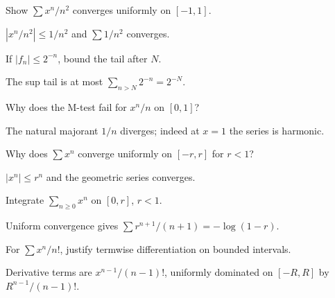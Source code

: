 \begin{problem}\label{prob:ii13-problem-01}
Show $\sum x^n/n^2$ converges uniformly on $[-1,1]$.
\end{problem}
\begin{solution}
$|x^n/n^2|\le1/n^2$ and $\sum1/n^2$ converges.
\end{solution}

\begin{problem}\label{prob:ii13-problem-02}
If $|f_n|\le2^{-n}$, bound the tail after $N$.
\end{problem}
\begin{solution}
The sup tail is at most $\sum_{n>N}2^{-n}=2^{-N}$.
\end{solution}

\begin{problem}\label{prob:ii13-problem-03}
Why does the M-test fail for $x^n/n$ on $[0,1]$?
\end{problem}
\begin{solution}
The natural majorant $1/n$ diverges; indeed at $x=1$ the series is harmonic.
\end{solution}

\begin{problem}\label{prob:ii13-problem-04}
Why does $\sum x^n$ converge uniformly on $[-r,r]$ for $r<1$?
\end{problem}
\begin{solution}
$|x^n|\le r^n$ and the geometric series converges.
\end{solution}

\begin{problem}\label{prob:ii13-problem-05}
Integrate $\sum_{n\ge0}x^n$ on $[0,r]$, $r<1$.
\end{problem}
\begin{solution}
Uniform convergence gives $\sum r^{n+1}/(n+1)=-\log(1-r)$.
\end{solution}

\begin{problem}\label{prob:ii13-problem-06}
For $\sum x^n/n!$, justify termwise differentiation on bounded intervals.
\end{problem}
\begin{solution}
Derivative terms are $x^{n-1}/(n-1)!$, uniformly dominated on $[-R,R]$ by $R^{n-1}/(n-1)!$.
\end{solution}

